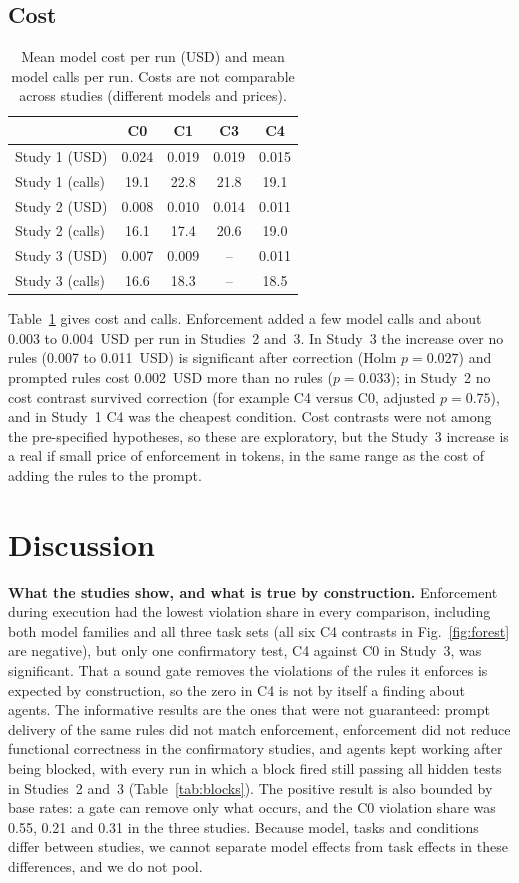 \documentclass[conference]{IEEEtran}
\begin{document}
\subsection{Cost}
\begin{table}[t]
\caption{Mean model cost per run (USD) and mean model calls per run. Costs are not comparable across studies (different models and prices).}
\label{tab:cost}
\centering
\small
\begin{tabular}{@{}lcccc@{}}
\toprule
 & C0 & C1 & C3 & C4\\
\midrule
Study 1 (USD) & 0.024 & 0.019 & 0.019 & 0.015\\
Study 1 (calls) & 19.1 & 22.8 & 21.8 & 19.1\\
Study 2 (USD) & 0.008 & 0.010 & 0.014 & 0.011\\
Study 2 (calls) & 16.1 & 17.4 & 20.6 & 19.0\\
Study 3 (USD) & 0.007 & 0.009 & -- & 0.011\\
Study 3 (calls) & 16.6 & 18.3 & -- & 18.5\\
\bottomrule
\end{tabular}
\end{table}
Table~\ref{tab:cost} gives cost and calls. Enforcement added a few model calls and about 0.003 to 0.004~USD per run in Studies~2 and~3. In Study~3 the increase over no rules (0.007 to 0.011~USD) is significant after correction (Holm $p=0.027$) and prompted rules cost 0.002~USD more than no rules ($p=0.033$); in Study~2 no cost contrast survived correction (for example C4 versus C0, adjusted $p=0.75$), and in Study~1 C4 was the cheapest condition. Cost contrasts were not among the pre-specified hypotheses, so these are exploratory, but the Study~3 increase is a real if small price of enforcement in tokens, in the same range as the cost of adding the rules to the prompt.

\section{Discussion}
\textbf{What the studies show, and what is true by construction.}
Enforcement during execution had the lowest violation share in every comparison, including both model families and all three task sets (all six C4 contrasts in Fig.~\ref{fig:forest} are negative), but only one confirmatory test, C4 against C0 in Study~3, was significant.
That a sound gate removes the violations of the rules it enforces is expected by construction, so the zero in C4 is not by itself a finding about agents.
The informative results are the ones that were not guaranteed: prompt delivery of the same rules did not match enforcement, enforcement did not reduce functional correctness in the confirmatory studies, and agents kept working after being blocked, with every run in which a block fired still passing all hidden tests in Studies~2 and~3 (Table~\ref{tab:blocks}).
The positive result is also bounded by base rates: a gate can remove only what occurs, and the C0 violation share was 0.55, 0.21 and 0.31 in the three studies.
Because model, tasks and conditions differ between studies, we cannot separate model effects from task effects in these differences, and we do not pool.
\end{document}
